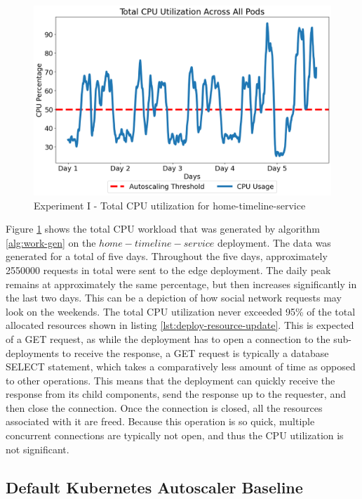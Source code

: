\begin{figure}[htb]
    \centering
    \caption{Experiment I - Total CPU utilization for home-timeline-service}
    \label{fig:exp1-workload}
    \includegraphics[width=0.6\linewidth]{Figures/GET-Total-CPU.png}
\end{figure}

Figure \ref{fig:exp1-workload} shows the total CPU workload that was generated by algorithm \ref{alg:work-gen} on the $home-timeline-service$ deployment. The data was generated for a total of five days. Throughout the five days, approximately \num[group-separator={,}]{2550000} requests in total were sent to the edge deployment. The daily peak remains at approximately the same percentage, but then increases significantly in the last two days. This can be a depiction of how social network requests may look on the weekends. The total CPU utilization never exceeded 95\% of the total allocated resources shown in listing \ref{lst:deploy-resource-update}. This is expected of a GET request, as while the deployment has to open a connection to the sub-deployments to receive the response, a GET request is typically a database SELECT statement, which takes a comparatively less amount of time as opposed to other operations. This means that the deployment can quickly receive the response from its child components, send the response up to the requester, and then close the connection. Once the connection is closed, all the resources associated with it are freed. Because this operation is so quick, multiple concurrent connections are typically not open, and thus the CPU utilization is not significant.\par

\subsection {Default Kubernetes Autoscaler Baseline}
\label{subsec:ch5-exp1-default-algo}

